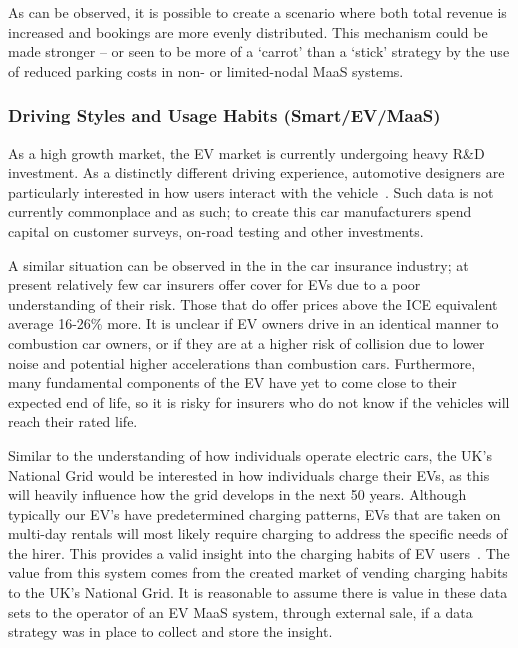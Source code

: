 \documentclass[journal]{IEEEtran}
\begin{document}

As can be observed, it is possible to create a scenario where both
total revenue is increased and bookings are more evenly
distributed. This mechanism could be made stronger -- or seen to be
more of a `carrot' than a `stick' strategy by the use of reduced
parking costs in non- or limited-nodal MaaS systems.

\subsubsection{Driving Styles and Usage Habits (Smart/EV/MaaS)} 

As a high growth market, the EV market is currently undergoing heavy
R\&D investment. As a distinctly different driving experience,
automotive designers are particularly interested in how users interact
with the vehicle~\cite{ferreira-et-al:2013}. Such data is not
currently commonplace and as such; to create this car manufacturers
spend capital on customer surveys, on-road testing and other
investments.

A similar situation can be observed in the in the car insurance
industry; at present relatively few car insurers offer cover for EVs
due to a poor understanding of their risk. Those that do offer prices
above the ICE equivalent average 16-26\% more. It is unclear if EV
owners drive in an identical manner to combustion car owners, or if
they are at a higher risk of collision due to lower noise and
potential higher accelerations than combustion cars. Furthermore, many
fundamental components of the EV have yet to come close to their
expected end of life, so it is risky for insurers who do not know if
the vehicles will reach their rated life.

Similar to the understanding of how individuals operate electric cars,
the UK’s National Grid would be interested in how individuals charge
their EVs, as this will heavily influence how the grid develops in the
next 50 years. Although typically our EV's have predetermined charging
patterns, EVs that are taken on multi-day rentals will most likely
require charging to address the specific needs of the hirer. This
provides a valid insight into the charging habits of EV
users~\cite{kennel-et-al:2012,darabi+ferdowsi:2013}. The value from
this system comes from the created market of vending charging habits
to the UK's National Grid. It is reasonable to assume there is value
in these data sets to the operator of an EV MaaS system, through
external sale, if a data strategy was in place to collect and store
the insight.
\end{document}
